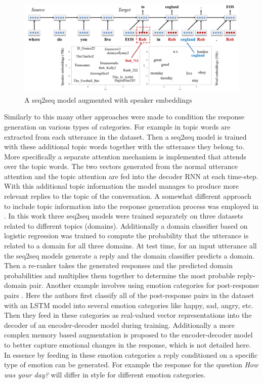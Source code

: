 \documentclass[12pt]{article}
\begin{document}
\begin{figure}[H]
	\centering
	\includegraphics[width=1.0\textwidth]{pics/persona.png}
	\caption{A seq2seq model augmented with speaker embeddings \cite{Li:2016}}
	\label{fig:persona}
\end{figure}

Similarly to this many other approaches were made to condition the response generation on various types of categories. For example in \cite{Xing_topic:2017} topic words are extracted from each utterance in the dataset. Then a seq2seq model is trained with these additional topic words together with the utterance they belong to. More specifically a separate attention mechanism is implemented that attends over the topic words. The two vectors generated from the normal utterance attention and the topic attention are fed into the decoder RNN at each time-step. With this additional topic information the model manages to produce more relevant replies to the topic of the conversation. A somewhat different approach to include topic information into the response generation process was employed in \cite{Choudhary:2017}. In this work three seq2seq models were trained separately on three datasets related to different topics (domains). Additionally a domain classifier based on logistic regression was trained to compute the probability that the utterance is related to a domain for all three domains. At test time, for an input utterance all the seq2seq models generate a reply and the domain classifier predicts a domain. Then a re-ranker takes the generated responses and the predicted domain probabilities and multiplies them together to determine the most probable reply-domain pair. Another example involves using emotion categories for post-response pairs \cite{Zhou:2017}. Here the authors first classify all of the post-response pairs in the dataset with an LSTM model into several emotion categories like happy, sad, angry, etc. Then they feed in these categories as real-valued vector representations into the decoder of an encoder-decoder model during training. Additionally a more complex memory based augmentation is proposed to the encoder-decoder model to better capture emotional changes in the response, which is not detailed here. In essence by feeding in these emotion categories a reply conditioned on a specific type of emotion can be generated. For example the response for the question \textit{How was your day?} will differ in style for different emotion categories.
\end{document}
